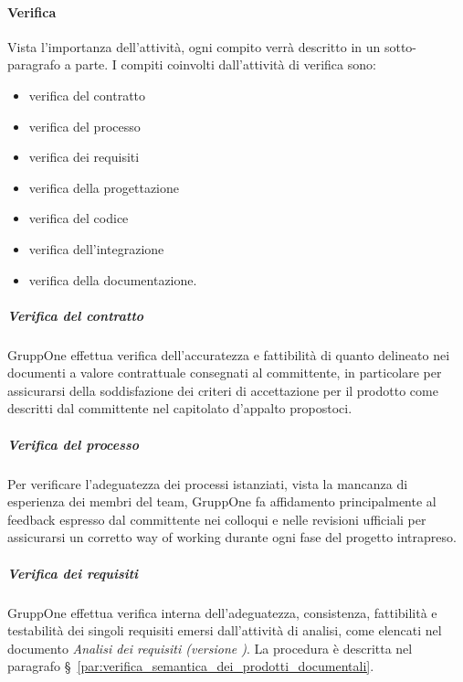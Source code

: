 \documentclass[../../norme-di-progetto.tex]{subfiles}
\begin{document}
\paragraph{Verifica}%
\label{par:verifica}

Vista l'importanza dell'attività, ogni compito verrà descritto in un sotto-paragrafo a parte. I compiti coinvolti dall'attività di verifica sono:

\begin{itemize}
  \item verifica del contratto
  \item verifica del processo
  \item verifica dei requisiti
  \item verifica della progettazione
  \item verifica del codice
  \item verifica dell'integrazione
  \item verifica della documentazione.
\end{itemize}

\subparagraph{Verifica del contratto}%
\label{subp:verifica_del_contratto}

GruppOne effettua verifica dell'accuratezza e fattibilità di quanto delineato nei documenti a valore contrattuale consegnati al committente, in particolare per assicurarsi della soddisfazione dei criteri di accettazione per il prodotto come descritti dal committente nel capitolato d'appalto propostoci.


\subparagraph{Verifica del processo}%
\label{subp:verifica_del_processo}

Per verificare l'adeguatezza dei processi istanziati, vista la mancanza di esperienza dei membri del team, GruppOne fa affidamento principalmente al feedback espresso dal committente nei colloqui e nelle revisioni ufficiali per assicurarsi un corretto way of working durante ogni fase del progetto intrapreso.


\subparagraph{Verifica dei requisiti}%
\label{subp:verifica_dei_requisiti}

GruppOne effettua verifica interna dell'adeguatezza, consistenza, fattibilità e testabilità dei singoli requisiti emersi dall'attività di analisi, come elencati nel documento \textit{Analisi dei requisiti (versione \versione)}.
La procedura è descritta nel paragrafo §~\ref{par:verifica_semantica_dei_prodotti_documentali}.
\end{document}
